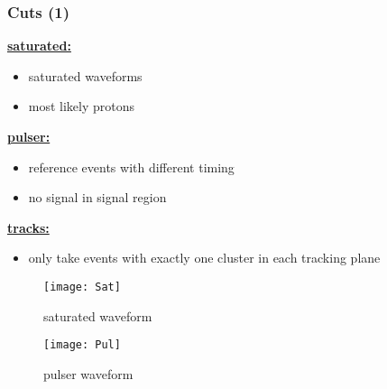 \begin{frame}
	\frametitle{Cuts (1)}
	\begin{minipage}{8cm}
		\textbf{\underline{saturated:}}
		\begin{itemize}
			\setlength{\itemsep}{\fill}
			\item saturated waveforms
			\item most likely protons
		\end{itemize}
		\vspace*{1cm}
		\textbf{\underline{pulser:}}
		\begin{itemize}
			\setlength{\itemsep}{\fill}
			\item reference events with different timing
			\item no signal in signal region
		\end{itemize}
		\vspace*{1cm}
		\textbf{\underline{tracks:}}
		\begin{itemize}
			\setlength{\itemsep}{\fill}
			\item only take events with exactly one cluster in each tracking plane
		\end{itemize}
	\end{minipage}
	\begin{minipage}{4cm}
		\vspace*{-5pt}
		\begin{figure}
			\centering
			\texttt{[image: Sat]}
			\vspace*{-8pt}
			\caption{saturated waveform}
		\end{figure}
		\vspace*{-25pt}
		\begin{figure}
			\centering
			\texttt{[image: Pul]}
			\vspace*{-8pt}
			\caption{pulser waveform}
		\end{figure}
	\end{minipage}
\end{frame}
